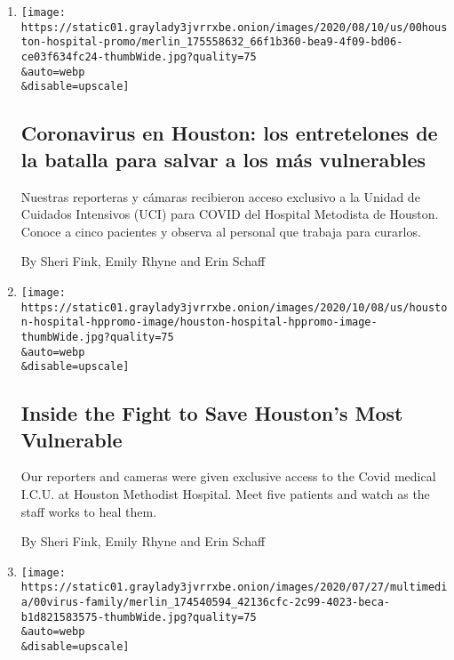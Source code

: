\begin{enumerate}
\def\labelenumi{\arabic{enumi}.}
\item
  \href{/es/interactive/2020/08/11/espanol/coronavirus-houston-hospital.html}{}

  \texttt{[image: https://static01.graylady3jvrrxbe.onion/images/2020/08/10/us/00houston-hospital-promo/merlin\_175558632\_66f1b360-bea9-4f09-bd06-ce03f634fc24-thumbWide.jpg?quality=75\\\&auto=webp\\\&disable=upscale]}

  \hypertarget{coronavirus-en-houston-los-entretelones-de-la-batalla-para-salvar-a-los-muxe1s-vulnerables}{%
  \subsection{Coronavirus en Houston: los entretelones de la batalla
  para salvar a los más
  vulnerables}\label{coronavirus-en-houston-los-entretelones-de-la-batalla-para-salvar-a-los-muxe1s-vulnerables}}

  Nuestras reporteras y cámaras recibieron acceso exclusivo a la Unidad
  de Cuidados Intensivos (UCI) para COVID del Hospital Metodista de
  Houston. Conoce a cinco pacientes y observa al personal que trabaja
  para curarlos.

  By Sheri Fink, Emily Rhyne and Erin Schaff
\item
  \href{/interactive/2020/08/10/us/houston-hospital-coronavirus.html}{}

  \texttt{[image: https://static01.graylady3jvrrxbe.onion/images/2020/10/08/us/houston-hospital-hppromo-image/houston-hospital-hppromo-image-thumbWide.jpg?quality=75\\\&auto=webp\\\&disable=upscale]}

  \hypertarget{inside-the-fight-to-save-houstons-most-vulnerable}{%
  \subsection{Inside the Fight to Save Houston's Most
  Vulnerable}\label{inside-the-fight-to-save-houstons-most-vulnerable}}

  Our reporters and cameras were given exclusive access to the Covid
  medical I.C.U. at Houston Methodist Hospital. Meet five patients and
  watch as the staff works to heal them.

  By Sheri Fink, Emily Rhyne and Erin Schaff
\item
  \href{/video/us/100000007253343/coronavirus-houston-family.html}{}

  \texttt{[image: https://static01.graylady3jvrrxbe.onion/images/2020/07/27/multimedia/00virus-family/merlin\_174540594\_42136cfc-2c99-4023-beca-b1d821583575-thumbWide.jpg?quality=75\\\&auto=webp\\\&disable=upscale]}


\end{enumerate}
